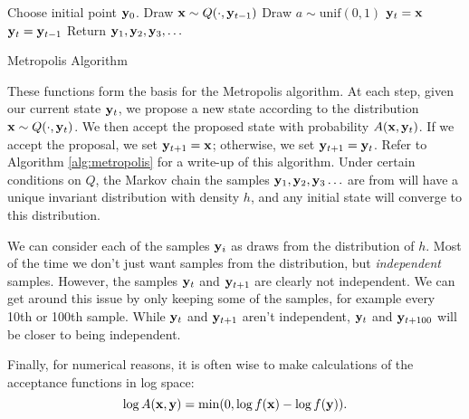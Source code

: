 \begin{algorithm}
\begin{algorithmic}[1]
    \State \textrm{Choose initial point } $\mathbf{y}_0$.
        \State \textrm{Draw } $\mathbf{x} \sim Q(\cdot, \mathbf{y}_{t-1})$
        \State \textrm{Draw } $a \sim \text{unif}(0,1)$
            \State $\mathbf{y}_t = \mathbf{x}$
        \Else
            \State $\mathbf{y}_t = \mathbf{y}_{t-1}$
        \EndIf
    \EndFor
    \State \textrm{Return } $\mathbf{y}_1,\mathbf{y}_2,\mathbf{y}_3,\ldots$
\EndProcedure
\end{algorithmic}
\caption{Metropolis Algorithm}
\label{alg:metropolis}
\end{algorithm}
These functions form the basis for the Metropolis algorithm.
At each step, given our current state $\mathbf{y}_t$, we propose a new state according to the distribution $\mathbf{x}\sim Q(\cdot, \mathbf{y}_t)$.
We then accept the proposed state with probability $A(\mathbf{x}, \mathbf{y}_t)$.
If we accept the proposal, we set $\mathbf{y}_{t+1}=\mathbf{x}$; otherwise, we set $\mathbf{y}_{t+1}=\mathbf{y}_t$.
Refer to Algorithm \ref{alg:metropolis} for a write-up of this algorithm.
Under certain conditions on $Q$, the Markov chain the samples $\mathbf{y}_1,\mathbf{y}_2,\mathbf{y}_3\ldots$ are from will have a unique invariant distribution with density $h$, and any initial state will converge to this distribution.

We can consider each of the samples $\mathbf{y}_i$ as draws from the distribution of $h$.
Most of the time we don't just want samples from the distribution, but \emph{independent} samples.
However, the samples $\mathbf{y}_t$ and $\mathbf{y}_{t+1}$ are clearly not independent.
We can get around this issue by only keeping some of the samples, for example every 10th or 100th sample.
While $\mathbf{y}_t$ and $\mathbf{y}_{t+1}$ aren't independent, $\mathbf{y}_t$ and $\mathbf{y}_{t+100}$ will be closer to being independent.

Finally, for numerical reasons, it is often wise to make calculations of the acceptance functions in log space:
\[
\log A(\mathbf{x},\mathbf{y}) = \min(0, \log f(\mathbf{x}) - \log f(\mathbf{y})).
\]


